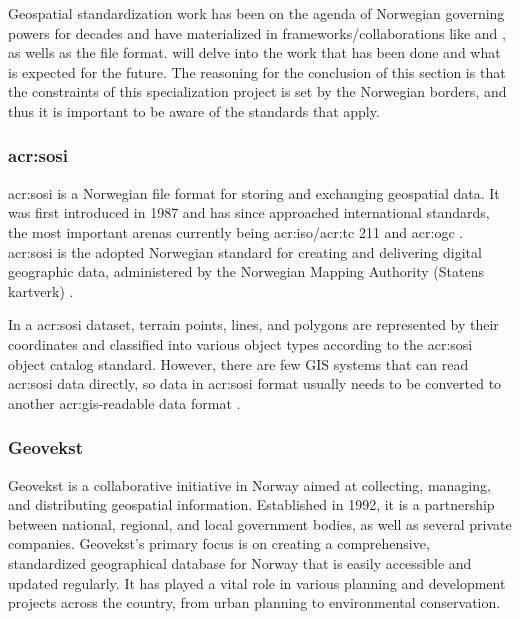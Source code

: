 
Geospatial standardization work has been on the agenda of Norwegian governing powers for decades and have materialized in frameworks/collaborations like  and , as wells as the  file format.  will delve into the work that has been done and what is expected for the future. The reasoning for the conclusion of this section is that the constraints of this specialization project is set by the Norwegian borders, and thus it is important to be aware of the standards that apply.

\subsubsection[SOSI]{\acrshort{acr:sosi}}\label{subsubsec:sosi}

\gls{acr:sosi} is a Norwegian file format for storing and exchanging geospatial data. It was first introduced in 1987 and has since approached international standards, the most important arenas currently being \acrshort{acr:iso}/\acrshort{acr:tc} 211 and \gls{acr:ogc} \citep{mardalNasjonalStrategiVidereutvikling2015}. \gls{acr:sosi} is the adopted Norwegian standard for creating and delivering digital geographic data, administered by the Norwegian Mapping Authority (Statens kartverk) \citep{maehlumSOSI2023}.

In a \gls{acr:sosi} dataset, terrain points, lines, and polygons are represented by their coordinates and classified into various object types according to the \gls{acr:sosi} object catalog standard. However, there are few GIS systems that can read \gls{acr:sosi} data directly, so data in \gls{acr:sosi} format usually needs to be converted to another \gls{acr:gis}-readable data format \citep{maehlumSOSI2023}.

\subsubsection{Geovekst}\label{subsubsec:geovekst}

Geovekst is a collaborative initiative in Norway aimed at collecting, managing, and distributing geospatial information. Established in 1992, it is a partnership between national, regional, and local government bodies, as well as several private companies. Geovekst's primary focus is on creating a comprehensive, standardized geographical database for Norway that is easily accessible and updated regularly. It has played a vital role in various planning and development projects across the country, from urban planning to environmental conservation.

